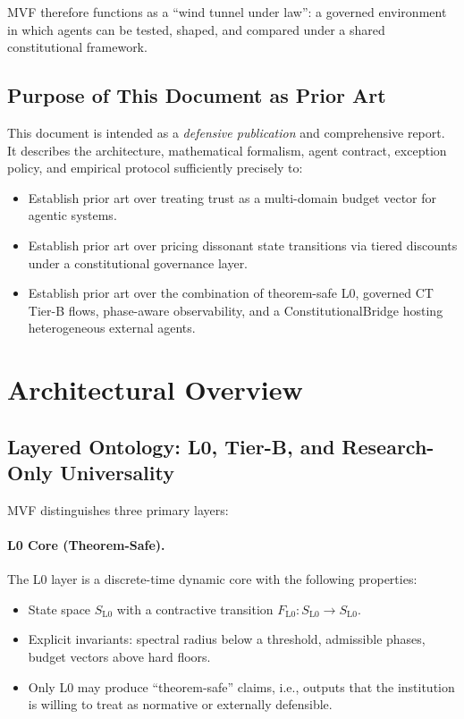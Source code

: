 \documentclass[11pt]{article}
\begin{document}
MVF therefore functions as a ``wind tunnel under law'': a governed environment in which agents can be tested, shaped, and compared under a shared constitutional framework.

\subsection{Purpose of This Document as Prior Art}

This document is intended as a \emph{defensive publication} and comprehensive report. It describes the architecture, mathematical formalism, agent contract, exception policy, and empirical protocol sufficiently precisely to:

\begin{itemize}[itemsep=2pt]
  \item Establish prior art over treating trust as a multi-domain budget vector for agentic systems.
  \item Establish prior art over pricing dissonant state transitions via tiered discounts under a constitutional governance layer.
  \item Establish prior art over the combination of theorem-safe L0, governed CT Tier-B flows, phase-aware observability, and a ConstitutionalBridge hosting heterogeneous external agents.
\end{itemize}

\section{Architectural Overview}

\subsection{Layered Ontology: L0, Tier-B, and Research-Only Universality}

MVF distinguishes three primary layers:

\paragraph{L0 Core (Theorem-Safe).}
The L0 layer is a discrete-time dynamic core with the following properties:

\begin{itemize}[itemsep=2pt]
  \item State space \(S_{\mathrm{L0}}\) with a contractive transition \(F_{\mathrm{L0}}\colon S_{\mathrm{L0}} \to S_{\mathrm{L0}}\).
  \item Explicit invariants: spectral radius below a threshold, admissible phases, budget vectors above hard floors.
  \item Only L0 may produce ``theorem-safe'' claims, i.e., outputs that the institution is willing to treat as normative or externally defensible.
\end{itemize}
\end{document}

